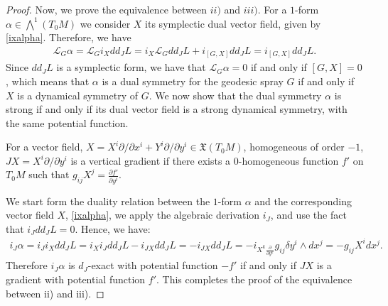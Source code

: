 \documentclass[10pt,a4paper]{amsart}
\begin{document}
\begin{proof}
Now, we prove the equivalence between $ii)$ and $iii)$. For a $1$-form $\alpha\in \bigwedge^1(T_0M)$ we consider $X$ its symplectic dual vector field, given by \eqref{ixalpha}. Therefore, we have
\begin{eqnarray*} 
\mathcal{L}_G\alpha = \mathcal{L}_Gi_Xdd_JL=i_X\mathcal{L}_Gdd_JL +i_{[G,X]}dd_JL = i_{[G,X]}dd_JL. 
\end{eqnarray*}
Since $dd_JL$ is a symplectic form, we have that $\mathcal{L}_G\alpha=0$ if and only if $[G,X]=0$, which means that $\alpha$ is a dual symmetry for the geodesic spray $G$ if and only if $X$ is a dynamical symmetry of $G$. We now show that the dual symmetry $\alpha$ is strong if and only if its dual vector field is a strong dynamical symmetry, with the same potential function. 

For a vector field, $X=X^i{\partial}/{\partial x^i} + Y^i{\partial}/{\partial y^i}\in \mathfrak{X}(T_0M)$, homogeneous of order $-1$, $JX=X^i{\partial}/{\partial y^i}$ is a vertical gradient if there exists a $0$-homogeneous function $f'$ on $T_0M$ such that $g_{ij}X^j=\frac{\partial f'}{\partial y^i}$. 

We start form the duality relation between the $1$-form $\alpha$ and the corresponding vector field $X$, \eqref{ixalpha}, we apply the algebraic derivation $i_J$, and use the fact that $i_Jdd_JL=0$. Hence, we have:
\begin{eqnarray*}
i_J\alpha=i_Ji_Xdd_JL=i_Xi_Jdd_JL - i_{JX}dd_JL=-i_{JX}dd_JL= - i_{X^k\frac{\partial}{\partial y^k}}g_{ij}\delta y^i\wedge dx^j = - g_{ij}X^idx^j.
\end{eqnarray*} 
Therefore $i_J\alpha$ is $d_J$-exact with potential function $-f'$ if and only if $JX$ is a gradient with potential function $f'$. This completes the proof of the equivalence between ii) and iii).   
\end{proof}
\end{document}
